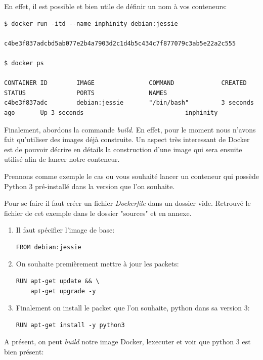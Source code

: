 En effet, il est possible et bien utile de définir un nom à vos conteneurs:

\begin{lstlisting}[frame=single]
$ docker run -itd --name inphinity debian:jessie

c4be3f837adcbd5ab077e2b4a7903d2c1d4b5c434c7f877079c3ab5e22a2c555

$ docker ps

CONTAINER ID        IMAGE               COMMAND             CREATED             STATUS              PORTS               NAMES
c4be3f837adc        debian:jessie       "/bin/bash"         3 seconds ago       Up 3 seconds                            inphinity
\end{lstlisting}

Finalement, abordons la commande \emph{build}. En effet, pour le moment nous n'avons fait qu'utiliser des images déjà construite. Un aspect très interessant de Docker est de pouvoir décrire en détails la construction d'une image qui sera ensuite utilisé afin de lancer notre conteneur.

Prennons comme exemple le cas ou vous souhaité lancer un conteneur qui possède Python 3 pré-installé dans la version que l'on souhaite.

Pour se faire il faut créer un fichier \emph{Dockerfile} dans un dossier vide. Retrouvé le fichier de cet exemple dans le dossier "sources" et en annexe.

\begin{enumerate}
\item Il faut spécifier l'image de base:
\begin{lstlisting}[frame=single]
FROM debian:jessie
\end{lstlisting}

\item On souhaite premièrement mettre à jour les packets:
\begin{lstlisting}[frame=single]
RUN apt-get update && \
    apt-get upgrade -y
\end{lstlisting}

\item Finalement on install le packet que l'on souhaite, python dans sa version 3:
\begin{lstlisting}[frame=single]
RUN apt-get install -y python3
\end{lstlisting}

\end{enumerate}

A présent, on peut \emph{build} notre image Docker, lexecuter et voir que python 3 est bien présent:

